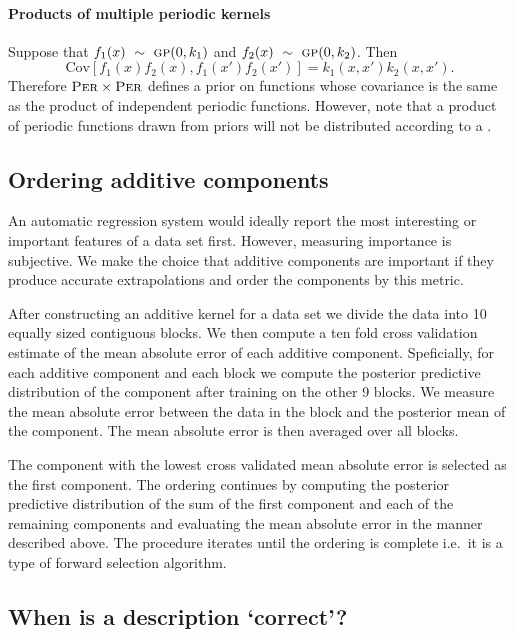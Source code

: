 \documentclass{article}
\def\ie{i.e.\ }
\begin{document}
\paragraph{Products of multiple periodic kernels}

Suppose that ${f_1(x) \ \sim\  {\textsc{gp}}{}(0, k_1)}$ and ${f_2(x) \ \sim\  {\textsc{gp}}{}(0, k_2)}$.
Then
\begin{equation}
{\textrm{Cov} \left[f_1(x)f_2(x), f_1(x')f_2(x') \right] = k_1(x,x')k_2(x,x')}.
\end{equation}
Therefore ${\textsc{Per}} \times {\textsc{Per}}$ defines a prior on functions whose covariance is the same as the product of independent periodic functions.  However, note that a product of periodic functions drawn from \gp{} priors will not be distributed according to a \gp{}.

\subsection{Ordering additive components}


An automatic regression system would ideally report the most interesting or important features of a data set first.
However, measuring importance is subjective.
We make the choice that additive components are important if they produce accurate extrapolations and order the components by this metric.

After constructing an additive kernel for a data set we divide the data into 10 equally sized contiguous blocks.
We then compute a ten fold cross validation estimate of the mean absolute error of each additive component.
Speficially, for each additive component and each block we compute the posterior predictive distribution of the component after training on the other 9 blocks.
We measure the mean absolute error between the data in the block and the posterior mean of the component.
The mean absolute error is then averaged over all blocks.

The component with the lowest cross validated mean absolute error is selected as the first component.
The ordering continues by computing the posterior predictive distribution of the sum of the first component and each of the remaining components and evaluating the mean absolute error in the manner described above.
The procedure iterates until the ordering is complete \ie it is a type of forward selection algorithm.

\subsection{When is a description `correct'?}
\end{document}
